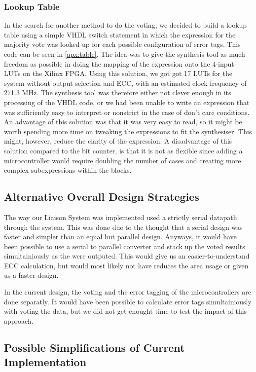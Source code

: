 \subsubsection{Lookup Table}
In the search for another method to do the voting, we decided to build
a lookup table using a simple VHDL switch statement in which the
expression for the majority vote was looked up for each possible
configuration of error tags. This code can be seen in
\autoref{apx:table}. The idea was to give the synthesis tool as much
freedom as possible in doing the mapping of the expression onto the
4-input LUTs on the Xilinx FPGA. Using this solution, we got got 17
LUTs for the system without output selection and ECC, with an
estimated clock frequency of 271.3 MHz. The synthesis tool was
therefore either not clever enough in its processing of the VHDL code,
or we had been unable to write an expression that was sufficiently
easy to interpret or nonstrict in the case of don't care
conditions. An advantage of this solution was that it was very easy to
read, so it might be worth spending more time on tweaking the
expressions to fit the synthesiser. This might, however, reduce the
clarity of the expression. A disadvantage of this solution compared to
the bit counter, is that it is not as flexible since adding a
microcontroller would require doubling the number of cases and
creating more complex subexpressions within the blocks.

\subsection{Alternative Overall Design Strategies}
The way our Liaison System was implemented used a strictly serial datapath through the
system. This was done due to the thought that a serial design was faster and simpler
than an equal but parallel design. Anyways, it would have been possible to
use a serial to parallel converter and stack up the voted results simultainiously as
the were outputed. This would give us an easier-to-understand ECC calculation, but would most likely
not have reduces the area usage or given us a faster design.

In the current design, the voting and the error tagging of the microcontrollers are done
separatly. It would have been possible to calculate error tags simultainiously with voting
the data, but we did not get enought time to test the impact of this approach.

\subsection{Possible Simplifications of Current Implementation}


